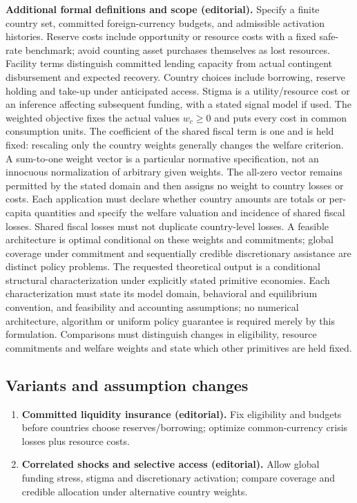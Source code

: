 \documentclass[11pt,a4paper]{article}
\begin{document}
\textbf{Additional formal definitions and scope (editorial).} Specify a finite country set, committed foreign-currency budgets, and admissible activation histories. Reserve costs include opportunity or resource costs with a fixed safe-rate benchmark; avoid counting asset purchases themselves as lost resources. Facility terms distinguish committed lending capacity from actual contingent disbursement and expected recovery. Country choices include borrowing, reserve holding and take-up under anticipated access. Stigma is a utility/resource cost or an inference affecting subsequent funding, with a stated signal model if used. The weighted objective fixes the actual values \(w_c\geq0\) and puts every cost in common consumption units. The coefficient of the shared fiscal term is one and is held fixed: rescaling only the country weights generally changes the welfare criterion. A sum-to-one weight vector is a particular normative specification, not an innocuous normalization of arbitrary given weights. The all-zero vector remains permitted by the stated domain and then assigns no weight to country losses or costs. Each application must declare whether country amounts are totals or per-capita quantities and specify the welfare valuation and incidence of shared fiscal losses. Shared fiscal losses must not duplicate country-level losses. A feasible architecture is optimal conditional on these weights and commitments; global coverage under commitment and sequentially credible discretionary assistance are distinct policy problems. The requested theoretical output is a conditional structural characterization under explicitly stated primitive economies. Each characterization must state its model domain, behavioral and equilibrium convention, and feasibility and accounting assumptions; no numerical architecture, algorithm or uniform policy guarantee is required merely by this formulation. Comparisons must distinguish changes in eligibility, resource commitments and welfare weights and state which other primitives are held fixed.
\subsection*{Variants and assumption changes}
\begin{enumerate}
\item \textbf{Committed liquidity insurance (editorial).} Fix eligibility and budgets before countries choose reserves/borrowing; optimize common-currency crisis losses plus resource costs.
\item \textbf{Correlated shocks and selective access (editorial).} Allow global funding stress, stigma and discretionary activation; compare coverage and credible allocation under alternative country weights.
\end{enumerate}
\end{document}

